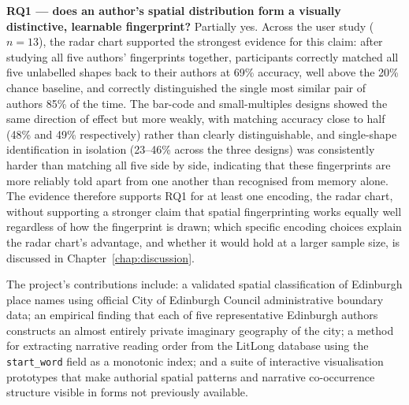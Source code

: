 \documentclass[logo,msc]{infthesis}
\begin{document}
\textbf{RQ1 --- does an author's spatial distribution form a visually distinctive, learnable fingerprint?} Partially yes. Across the user study ($n=13$), the radar chart supported the strongest evidence for this claim: after studying all five authors' fingerprints together, participants correctly matched all five unlabelled shapes back to their authors at 69\% accuracy, well above the 20\% chance baseline, and correctly distinguished the single most similar pair of authors 85\% of the time. The bar-code and small-multiples designs showed the same direction of effect but more weakly, with matching accuracy close to half (48\% and 49\% respectively) rather than clearly distinguishable, and single-shape identification in isolation (23--46\% across the three designs) was consistently harder than matching all five side by side, indicating that these fingerprints are more reliably told apart from one another than recognised from memory alone. The evidence therefore supports RQ1 for at least one encoding, the radar chart, without supporting a stronger claim that spatial fingerprinting works equally well regardless of how the fingerprint is drawn; which specific encoding choices explain the radar chart's advantage, and whether it would hold at a larger sample size, is discussed in Chapter~\ref{chap:discussion}.

The project's contributions include: a validated spatial classification of Edinburgh place names using official City of Edinburgh Council administrative boundary data; an empirical finding that each of five representative Edinburgh authors constructs an almost entirely private imaginary geography of the city; a method for extracting narrative reading order from the LitLong database using the \texttt{start\_word} field as a monotonic index; and a suite of interactive visualisation prototypes that make authorial spatial patterns and narrative co-occurrence structure visible in forms not previously available.
 
\end{document}
